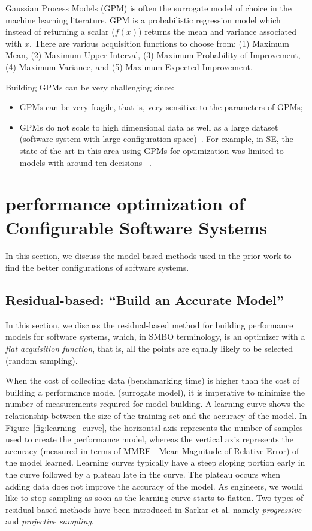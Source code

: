 \documentclass[10pt,journal,compsoc]{IEEEtran}
\newcommand{\bi}{\begin{itemize}}
\newcommand{\ei}{\end{itemize}}
\begin{document}
Gaussian Process Models (GPM) is often the surrogate model of choice in the machine learning literature.
GPM is a probabilistic regression model which instead of returning a scalar ($f(x)$) returns the mean and variance associated with $x$. There are various acquisition functions  to choose from: (1) Maximum Mean, (2) Maximum Upper Interval, (3) Maximum Probability of Improvement, (4) Maximum Variance, and (5) Maximum Expected Improvement. 

\noindent Building GPMs can be very challenging since:\label{sec:bo_shortcomings}
\bi[leftmargin=*]
\item
GPMs can be very fragile, that is, very sensitive to the parameters of GPMs;
\item
GPMs do not scale to  high dimensional data as well as a large dataset (software system with large configuration space)~\cite{shen2006fast}. For example, in SE, the state-of-the-art in this area using GPMs for  optimization was
limited to models with around ten decisions ~\cite{wang2016bayesian}.
\ei


\section{performance optimization of Configurable Software Systems}
In this section, we discuss the model-based methods used in the prior work to find the better configurations of software systems. \subsection{Residual-based: ``Build an Accurate Model''}\label{sec:residual}
In this section, we discuss the residual-based method for building performance models for software systems, which, in SMBO terminology, is an optimizer with a \textit{flat acquisition function}, that is, all the points are equally likely to be selected (random sampling). 

When the cost of collecting data (benchmarking time) is higher than the cost of building a performance model (surrogate model), it is imperative to minimize the number of measurements required for model building. A learning curve shows the relationship between the size of the training set and the accuracy of the model. In Figure~\ref{fig:learning_curve}, the horizontal axis represents the number of samples used to create the performance model, whereas the vertical axis represents the accuracy (measured in terms of MMRE---Mean Magnitude of Relative Error) of the model learned. 
Learning curves typically have a steep sloping portion early in the curve followed by a plateau late in the curve. The plateau occurs when adding data does not improve the accuracy of the model. As engineers, we would like to stop sampling as soon as the learning curve starts to flatten. 
Two types of residual-based methods have been introduced in Sarkar et al. namely \textit{progressive} and \textit{projective sampling}. \\
\end{document}
